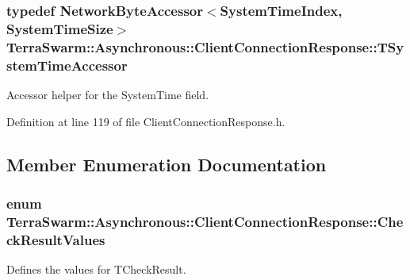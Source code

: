 \hypertarget{class_terra_swarm_1_1_asynchronous_1_1_client_connection_response_a64cb8d4313a5d10fa85b3e0b692764bd}{
\subsubsection[{T\-System\-Time\-Accessor}]{\setlength{\rightskip}{0pt plus 5cm}typedef {\bf Network\-Byte\-Accessor}$<${\bf System\-Time\-Index}, {\bf System\-Time\-Size}$>$ {\bf Terra\-Swarm\-::\-Asynchronous\-::\-Client\-Connection\-Response\-::\-T\-System\-Time\-Accessor}\hspace{0.3cm}{\ttfamily [private]}}}\label{class_terra_swarm_1_1_asynchronous_1_1_client_connection_response_a64cb8d4313a5d10fa85b3e0b692764bd}


Accessor helper for the System\-Time field. 



Definition at line 119 of file Client\-Connection\-Response.\-h.



\subsection{Member Enumeration Documentation}
\hypertarget{class_terra_swarm_1_1_asynchronous_1_1_client_connection_response_a6ca5be4e8bbd731c78f132f1c36513ab}{
\subsubsection[{Check\-Result\-Values}]{\setlength{\rightskip}{0pt plus 5cm}enum {\bf Terra\-Swarm\-::\-Asynchronous\-::\-Client\-Connection\-Response\-::\-Check\-Result\-Values}}}\label{class_terra_swarm_1_1_asynchronous_1_1_client_connection_response_a6ca5be4e8bbd731c78f132f1c36513ab}


Defines the values for T\-Check\-Result. 

